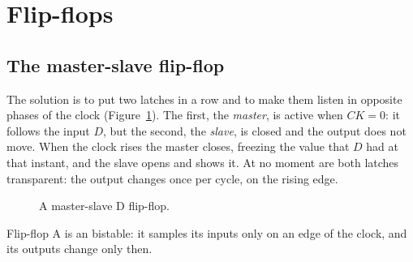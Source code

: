 \section{Flip-flops}

\subsection{The master-slave flip-flop}

The solution is to put two latches in a row and to make them listen in
opposite phases of the clock (Figure~\ref{fig:seq:ms}). The first, the
\emph{master}, is active when $CK=0$: it follows the input $D$, but the
second, the \emph{slave}, is closed and the output does not move. When the
clock rises the master closes, freezing the value that $D$ had at that
instant, and the slave opens and shows it. At no moment are both latches
transparent: the output changes once per cycle, on the rising edge.

\begin{figure}[htb]
\centering
{}
\caption{A master-slave D flip-flop.}
\label{fig:seq:ms}
\end{figure}

\begin{definition}{Flip-flop}
A  is an  bistable: it samples its inputs
only on an edge of the clock, and its outputs change only then.
\end{definition}

